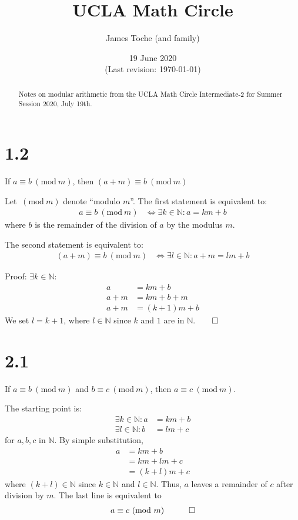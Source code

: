 \documentclass[12pt]{article}
\title{UCLA Math Circle}
\author{James Toche (and family)}
\date{19 June 2020 \\(Last revision: \today)}
\newcommand{\modulo}[1]{~(\mathrm{mod}~#1)}
\begin{document}
\begin{minipage}{\textwidth}
\maketitle
\begin{abstract}
Notes on modular arithmetic from the UCLA Math Circle Intermediate-2 for Summer Session 2020, July 19th. 
\end{abstract}
\end{minipage}

\newpage
\section*{1.2}
\begin{question}
If $a\equiv b\modulo{m}$, then $(a+m)\equiv b\modulo{m}$
\end{question}

Let $\modulo{m}$ denote ``modulo $m$''.  The first statement is equivalent to: 
\begin{align*}
a\equiv b\modulo{m}
 & \iff
\exists k\in\mathbb{N}: a = km + b
\end{align*}
where $b$ is the remainder of the division of $a$ by the modulus $m$. 

The second statement is equivalent to: 
\begin{align*}
(a+m)\equiv b\modulo{m}
 & \iff
\exists l\in\mathbb{N}: a+m = lm + b
\end{align*}

Proof: $\exists k\in\mathbb{N}$:
\begin{align*}
a 
  & = km + b \\
a + m
  & = km + b + m \\
a + m 
  & = (k+1)m + b
\end{align*}
We set $l=k+1$, where $l\in\mathbb{N}$ since $k$ and $1$ are in $\mathbb{N}$.$\qed$


\clearpage
\section*{2.1}
\begin{question}
If $a\equiv b\modulo{m}$ and $b\equiv c\modulo{m}$, then $a\equiv c\modulo{m}$.
\end{question}

The starting point is:
\begin{align*}
\exists k\in\mathbb{N}: a & = km + b \\
\exists l\in\mathbb{N}: b & = lm + c 
\end{align*}
for $a,b,c$ in $\mathbb{N}$. By simple substitution,
\begin{align*}
a & = km + b \\
  & = km + lm + c \\
  & = (k+l)m + c 
\end{align*}
where $(k+l)\in\mathbb{N}$ since $k\in\mathbb{N}$ and $l\in\mathbb{N}$. Thus, $a$ leaves a remainder of $c$ after division by $m$. The last line is equivalent to
\begin{align*}
a\equiv c\modulo{m} \quad \qed
\end{align*}
\end{document}
